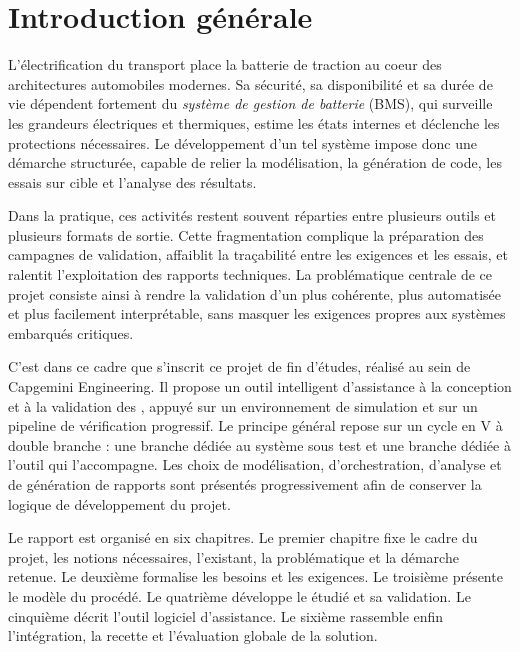 \chapter*{Introduction générale}

L'électrification du transport place la batterie de traction au coeur des
architectures automobiles modernes. Sa sécurité, sa disponibilité et sa durée
de vie dépendent fortement du \emph{système de gestion de batterie} (BMS), qui
surveille les grandeurs électriques et thermiques, estime les états internes et
déclenche les protections nécessaires. Le développement d'un tel système impose
donc une démarche structurée, capable de relier la modélisation, la génération
de code, les essais sur cible et l'analyse des résultats.

\noindent Dans la pratique, ces activités restent souvent réparties entre plusieurs
outils et plusieurs formats de sortie. Cette fragmentation complique la
préparation des campagnes de validation, affaiblit la traçabilité entre les
exigences et les essais, et ralentit l'exploitation des rapports techniques.
La problématique centrale de ce projet consiste ainsi à rendre la validation
d'un \bms{} plus cohérente, plus automatisée et plus facilement interprétable,
sans masquer les exigences propres aux systèmes embarqués critiques.

\noindent C'est dans ce cadre que s'inscrit ce projet de fin d'études, réalisé au sein de
Capgemini Engineering. Il propose un outil intelligent d'assistance à la
conception et à la validation des \bms{}, appuyé sur un environnement de
simulation et sur un pipeline de vérification progressif. Le principe général
repose sur un cycle en V à double branche : une branche dédiée au système sous
test et une branche dédiée à l'outil qui l'accompagne. Les choix de
modélisation, d'orchestration, d'analyse et de génération de rapports sont
présentés progressivement afin de conserver la logique de développement du
projet.

\noindent Le rapport est organisé en six chapitres. Le premier chapitre fixe le cadre du
projet, les notions nécessaires, l'existant, la problématique et la démarche
retenue. Le deuxième formalise les besoins et les exigences. Le troisième
présente le modèle du procédé. Le quatrième développe le \bms{} étudié et sa
validation. Le cinquième décrit l'outil logiciel d'assistance. Le sixième
rassemble enfin l'intégration, la recette et l'évaluation globale de la
solution.